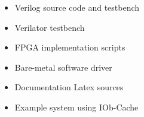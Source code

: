 \begin{itemize}                                            
  \itemsep-0.5em
\item Verilog source code and testbench
\item Verilator testbench
\item FPGA implementation scripts
\item Bare-metal software driver                                                   
\item Documentation Latex sources
\item Example system using IOb-Cache
\end{itemize}   
